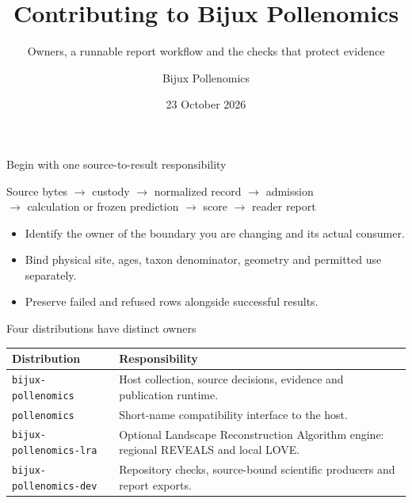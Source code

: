 
\title{Contributing to Bijux Pollenomics}
\subtitle{Owners, a runnable report workflow and the checks that protect evidence}
\author{Bijux Pollenomics}
\date{23 October 2026}

\frame{\titlepage}

\begin{frame}{Begin with one source-to-result responsibility}
\begin{center}
Source bytes $\rightarrow$ custody $\rightarrow$ normalized record $\rightarrow$ admission\\[0.8em]
$\rightarrow$ calculation or frozen prediction $\rightarrow$ score $\rightarrow$ reader report
\end{center}
\begin{itemize}
\item Identify the owner of the boundary you are changing and its actual consumer.
\item Bind physical site, ages, taxon denominator, geometry and permitted use separately.
\item Preserve failed and refused rows alongside successful results.
\end{itemize}
\end{frame}

\begin{frame}{Four distributions have distinct owners}
\small
\begin{tabular}{p{.34\linewidth}p{.54\linewidth}}
\toprule
Distribution & Responsibility \\
\midrule
\texttt{bijux-pollenomics} & Host collection, source decisions, evidence and publication runtime. \\
\texttt{pollenomics} & Short-name compatibility interface to the host. \\
\texttt{bijux-pollenomics-lra} & Optional Landscape Reconstruction Algorithm engine: regional REVEALS and local LOVE. \\
\texttt{bijux-pollenomics-dev} & Repository checks, source-bound scientific producers and report exports. \\
\bottomrule
\end{tabular}
\end{frame}

